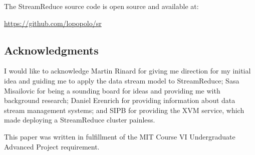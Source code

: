 \documentclass[12pt,twocolumn]{article}
\begin{document}
The StreamReduce source code is open source and available at:
\begin{center}
  \url{https://github.com/lopopolo/sr}
\end{center}

\subsection*{Acknowledgments}
I would like to acknowledge Martin Rinard for giving me direction for my initial idea
and guiding me to apply the data stream model to StreamReduce; Sasa Misailovic for being
a sounding board for ideas and providing me with background research; Daniel Erenrich for
providing information about data stream management systems; and SIPB for providing the
XVM service, which made deploying a StreamReduce cluster painless.

This paper was written in fulfillment of the MIT Course VI Undergraduate Advanced Project
requirement.

{}

\end{document}
